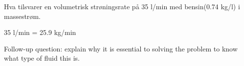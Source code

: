 

Hva tilsvarer en volumetrisk str{\o}ningsrate p{\aa} 35 l/min med bensin(0.74 kg/l) i massestr{\o}m. 








35 l/min = 25.9 kg/min

\vskip 10pt

Follow-up question: explain why it is essential to solving the problem to know what type of fluid this is.










